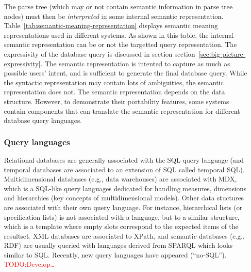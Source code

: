 \documentclass[10pt,journal,letterpaper,compsoc]{IEEEtran}
\newcommand\TODO[1]{{\textcolor{red}{TODO:#1\\}}}
\begin{document}
The parse tree (which may or not contain semantic information in parse tree
nodes) must then be {\it interpreted} in some internal semantic representation.
Table~\ref{tab:semantic-meaning-representation} displays semantic meaning
representations used in different systems.
As shown in this table, the internal semantic representation can be or not the
targetted query representation. 
The expressivity of the database query is discussed in section
section~\ref{sec:big-picture-expressivity}. 
The semantic representation is intented to capture as much as possible users'
intent, and is sufficient to generate the final database query. 
While the syntactic representation may contain lots of ambiguities, the semantic
representation does not. 
The semantic representation depends on the data structure. However, to
demonstrate their portability features, some systems contain components that
can translate the semantic representation for different database query
languages.

\subsubsection{Query languages}
Relational databases are generally associated with the SQL query language (and
temporal databases are associated to an extension of SQL called temporal SQL).
Multidimensional databases (e.g., data warehouses) are associated with MDX,
which is a SQL-like query languages dedicated for handling measures, dimensions
and hierarchies (key concepts of multidimensional models).
Other data stuctures are associated with their own query language. For instance,
hierarchical lists (or specification lists) is not associated with a language,
but to a similar structure, which is a template where empty slots correspond to
the expected items of the resultset. XML databases are associated to XPath, and
semantic databases (e.g., RDF) are usually queried with languages derived from
SPARQL which looks similar to SQL.
Recently, new query languages have appeared (``no-SQL''). 
\TODO{Develop\ldots}
\end{document}
